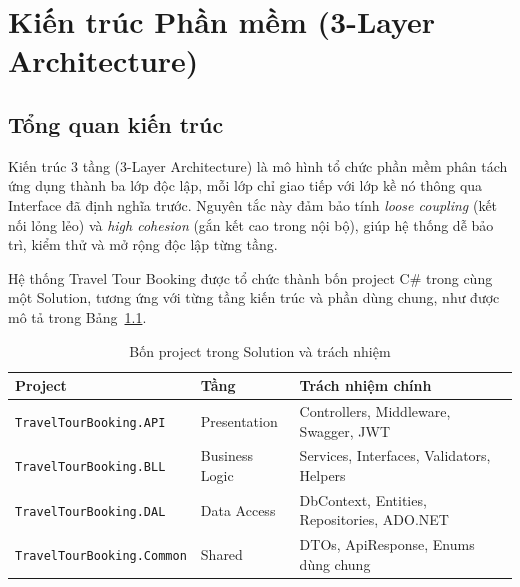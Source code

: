 
\chapter{Kiến trúc Phần mềm (3-Layer Architecture)}

\section{Tổng quan kiến trúc}\label{Sec3.1}

\begin{de}\label{def3.1}
Kiến trúc 3 tầng (3-Layer Architecture) là mô hình tổ chức phần
mềm phân tách ứng dụng thành ba lớp độc lập, mỗi lớp chỉ giao
tiếp với lớp kề nó thông qua Interface đã định nghĩa trước.
Nguyên tắc này đảm bảo tính \textit{loose coupling} (kết nối
lỏng lẻo) và \textit{high cohesion} (gắn kết cao trong nội bộ),
giúp hệ thống dễ bảo trì, kiểm thử và mở rộng độc lập từng tầng.
\end{de}

Hệ thống Travel Tour Booking được tổ chức thành bốn project C\#
trong cùng một Solution, tương ứng với từng tầng kiến trúc và
phần dùng chung, như được mô tả trong Bảng~\ref{table:projects}.

\begin{table}[H]
  \begin{center}
    \begin{tabular}{|l|l|l|}
      \hline
      \textbf{Project} & \textbf{Tầng} & \textbf{Trách nhiệm chính} \\
      \hline
      \texttt{TravelTourBooking.API}
        & Presentation
        & Controllers, Middleware, Swagger, JWT \\
      \hline
      \texttt{TravelTourBooking.BLL}
        & Business Logic
        & Services, Interfaces, Validators, Helpers \\
      \hline
      \texttt{TravelTourBooking.DAL}
        & Data Access
        & DbContext, Entities, Repositories, ADO.NET \\
      \hline
      \texttt{TravelTourBooking.Common}
        & Shared
        & DTOs, ApiResponse, Enums dùng chung \\
      \hline
    \end{tabular}
  \end{center}
  \caption{Bốn project trong Solution và trách nhiệm}
  \label{table:projects}
\end{table}

